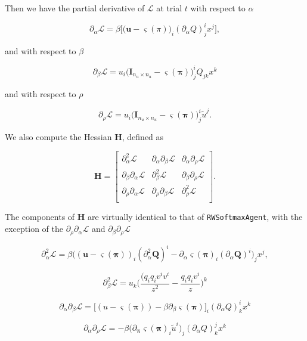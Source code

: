 Then we have the partial derivative of \(\mathcal L\) at trial \(t\)
with respect to \(\alpha\)

\[
\partial_{\alpha} \mathcal L = \beta \Big[ \big(\mathbf u - \varsigma(\pi)\big)_i (\partial_{\alpha} Q)^i_j x^j \Big],
\]

and with respect to \(\beta\)

\[
\partial_{\beta} \mathcal L = u_i \Big(\mathbf I_{n_u \times n_u} - \varsigma(\boldsymbol\pi)\Big)^i_j Q_{jk} x^k
\]

and with respect to \(\rho\)

\[
\partial_{\rho} \mathcal L = u_i \Big(\mathbf I_{n_u \times n_u} - \varsigma(\boldsymbol\pi)\Big)^i_j \tilde{u}^j.
\]

We also compute the Hessian \(\mathbf H\), defined as

\[
\mathbf H = \left[
\begin{array}{ccc}
\partial^2_{\alpha} \mathcal L & \partial_{\alpha} \partial_{\beta} \mathcal L & \partial_{\alpha} \partial_{\rho} \mathcal L \\
\partial_{\beta} \partial_{\alpha} \mathcal L & \partial^2_{\beta} \mathcal L & \partial_{\beta} \partial_{\rho} \mathcal L \\
\partial_{\rho} \partial_{\alpha} \mathcal L & \partial_{\rho} \partial_{\beta} \mathcal L & \partial^2_{\rho} \mathcal L \\
\end{array}\right].
\]

The components of \(\mathbf H\) are virtually identical to that of
\texttt{RWSoftmaxAgent}, with the exception of the
\(\partial_{\rho} \partial_{\alpha} \mathcal L\) and
\(\partial_{\beta} \partial_{\rho} \mathcal L\)

\[
\partial^2_{\alpha} \mathcal L = \beta \Big( (\mathbf u - \varsigma(\boldsymbol\pi))_i (\partial^2_{\alpha} \mathbf Q)^i - \partial_{\alpha} \varsigma(\boldsymbol\pi)_i (\partial_{\alpha} \mathbf Q)^i \Big)_j x^j,
\]

\[
\partial^2_{\beta} \mathcal L = u_k \Bigg(\frac{(q_i q_i v^i v^i}{z^2} - \frac{q_i q_i v^i}{z} \Bigg)^k
\]

\[
\partial_{\alpha} \partial_{\beta} \mathcal L = \Bigg[ (u - \varsigma(\boldsymbol\pi)) - \beta \partial_{\beta} \varsigma(\boldsymbol\pi) \Bigg]_i (\partial_{\alpha} Q)^i_k x^k
\]

\[
\partial_{\alpha} \partial_{\rho} \mathcal L = - \beta \Big( \partial_{\boldsymbol\pi} \varsigma(\boldsymbol\pi)_i \tilde{u}^i \Big)_j (\partial_{\alpha} Q)^j_k x^k
\]

